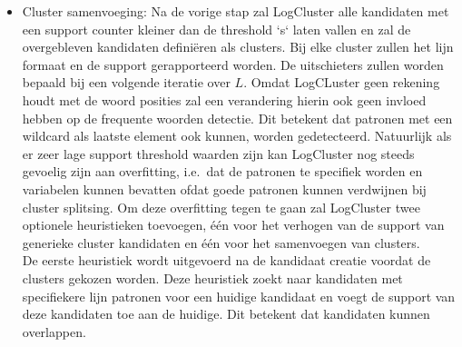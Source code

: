 \begin{itemize}
    \item Cluster samenvoeging: Na de vorige stap zal LogCluster alle kandidaten met een support counter kleiner dan de threshold `s` laten vallen en zal de overgebleven kandidaten definiëren als clusters. Bij elke cluster zullen het lijn formaat en de support gerapporteerd worden. De uitschieters zullen worden bepaald bij een volgende iteratie over $L$. Omdat LogCLuster geen rekening houdt met de woord posities zal een verandering hierin ook geen invloed hebben op de frequente woorden detectie. Dit betekent dat patronen met een wildcard als laatste element ook kunnen, worden gedetecteerd. Natuurlijk als er zeer lage support threshold waarden zijn kan LogCluster nog steeds gevoelig zijn aan overfitting, i.e.\ dat de patronen te specifiek worden en variabelen kunnen bevatten ofdat goede patronen kunnen verdwijnen bij cluster splitsing. Om deze overfitting tegen te gaan zal LogCluster twee optionele heuristieken toevoegen, één voor het verhogen van de support van generieke cluster kandidaten en één voor het samenvoegen van clusters.\\
    
    \subitem De eerste heuristiek wordt uitgevoerd na de kandidaat creatie voordat de clusters gekozen worden. Deze heuristiek zoekt naar kandidaten met specifiekere lijn patronen voor een huidige kandidaat en voegt de support van deze kandidaten toe aan de huidige. Dit betekent dat kandidaten kunnen overlappen.\\
    

\end{itemize}
